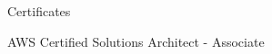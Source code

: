 \begin{cvlist}{Certificates}
  \item[\textbullet] AWS Certified Solutions Architect - Associate
\end{cvlist}